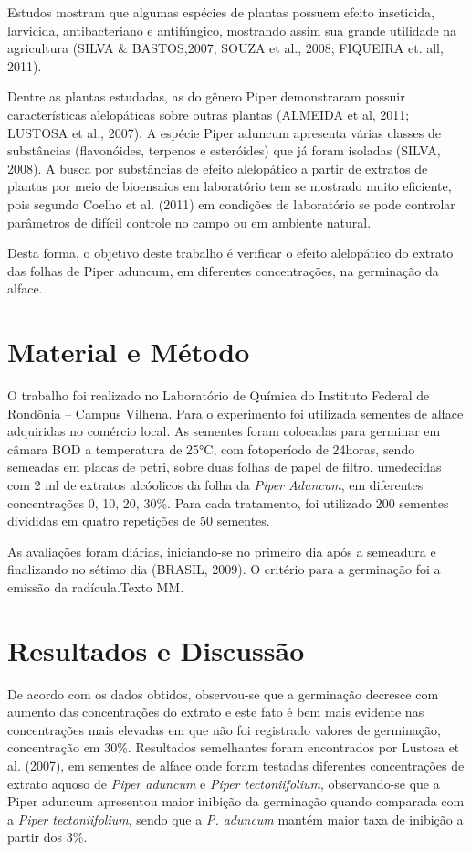 \documentclass[article,12pt,onesidea,4paper,english,brazil]{abntex2}
\begin{document}
	Estudos mostram que algumas espécies de plantas possuem efeito inseticida, larvicida, antibacteriano e antifúngico, mostrando assim sua grande utilidade na agricultura (SILVA \& BASTOS,2007; SOUZA et al., 2008; FIQUEIRA et. all, 2011).
	
	Dentre as plantas estudadas, as do gênero Piper demonstraram possuir características alelopáticas sobre outras plantas (ALMEIDA et al, 2011; LUSTOSA et al., 2007). A espécie Piper aduncum apresenta várias classes de substâncias (flavonóides, terpenos e esteróides) que já foram isoladas (SILVA, 2008). A busca por substâncias de efeito alelopático a partir de extratos de plantas por meio de bioensaios em laboratório tem se mostrado muito eficiente, pois segundo Coelho et al. (2011) em condições de laboratório se pode controlar parâmetros de difícil controle no campo ou em ambiente natural.
	
	Desta forma, o objetivo deste trabalho é verificar o efeito alelopático do extrato das folhas de Piper aduncum, em diferentes concentrações, na germinação da alface.
	
	\section*{Material e Método}
	
	O trabalho foi realizado no Laboratório de Química do Instituto Federal de Rondônia – Campus Vilhena. Para o experimento foi utilizada sementes de alface adquiridas no comércio local. As sementes foram colocadas para germinar em câmara BOD a temperatura de 25°C, com fotoperíodo de 24horas, sendo semeadas em placas de petri, sobre duas folhas de papel de filtro, umedecidas com 2 ml de extratos alcóolicos da folha da \textit{Piper Aduncum}, em diferentes concentrações 0, 10, 20, 30\%. Para cada tratamento, foi utilizado 200 sementes divididas em quatro repetições de 50 sementes.
	
	As avaliações foram diárias, iniciando-se no primeiro dia após a semeadura e finalizando no sétimo dia (BRASIL, 2009). O critério para a germinação foi a emissão da radícula.Texto MM.
	
	\section*{Resultados e Discussão}
	
	De acordo com os dados obtidos, observou-se que a germinação decresce com aumento das concentrações do extrato e este fato é bem mais evidente nas concentrações mais elevadas em que não foi registrado valores de germinação, concentração em 30\%. Resultados semelhantes foram encontrados por Lustosa et al. (2007), em sementes de alface onde foram testadas diferentes concentrações de extrato aquoso de \textit{Piper aduncum} e \textit{Piper tectoniifolium}, observando-se que a Piper aduncum apresentou maior inibição da germinação quando comparada com a \textit{Piper tectoniifolium}, sendo que a \textit{P. aduncum} mantém maior taxa de inibição a partir dos 3\%. 
	
\end{document}
